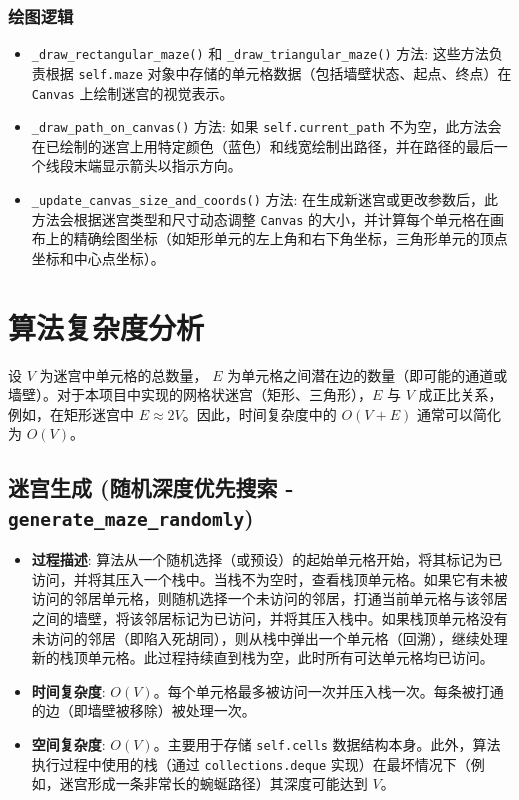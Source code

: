 \documentclass[UTF8]{report}
\theoremstyle{MyLineTheoremStyle} %
\theoremstyle{MyBlockTheoremStyle} %
\theoremstyle{MySubsubsectionStyle} %
\begin{document}
\subsubsection{绘图逻辑}
\begin{itemize}
    \item \texttt{\_draw\_rectangular\_maze()} 和 \texttt{\_draw\_triangular\_maze()} 方法: 这些方法负责根据 \texttt{self.maze} 对象中存储的单元格数据（包括墙壁状态、起点、终点）在 \texttt{Canvas} 上绘制迷宫的视觉表示。
    \item \texttt{\_draw\_path\_on\_canvas()} 方法: 如果 \texttt{self.current\_path} 不为空，此方法会在已绘制的迷宫上用特定颜色（蓝色）和线宽绘制出路径，并在路径的最后一个线段末端显示箭头以指示方向。
    \item \texttt{\_update\_canvas\_size\_and\_coords()} 方法: 在生成新迷宫或更改参数后，此方法会根据迷宫类型和尺寸动态调整 \texttt{Canvas} 的大小，并计算每个单元格在画布上的精确绘图坐标（如矩形单元的左上角和右下角坐标，三角形单元的顶点坐标和中心点坐标）。
\end{itemize}

\section{算法复杂度分析}

设 $V$ 为迷宫中单元格的总数量， $E$ 为单元格之间潜在边的数量（即可能的通道或墙壁）。对于本项目中实现的网格状迷宫（矩形、三角形），$E$ 与 $V$ 成正比关系，例如，在矩形迷宫中 $E \approx 2V$。因此，时间复杂度中的 $O(V+E)$ 通常可以简化为 $O(V)$。

\subsection{迷宫生成 (随机深度优先搜索 - \texttt{generate\_maze\_randomly})}
\begin{itemize}
    \item \textbf{过程描述}: 算法从一个随机选择（或预设）的起始单元格开始，将其标记为已访问，并将其压入一个栈中。当栈不为空时，查看栈顶单元格。如果它有未被访问的邻居单元格，则随机选择一个未访问的邻居，打通当前单元格与该邻居之间的墙壁，将该邻居标记为已访问，并将其压入栈中。如果栈顶单元格没有未访问的邻居（即陷入死胡同），则从栈中弹出一个单元格（回溯），继续处理新的栈顶单元格。此过程持续直到栈为空，此时所有可达单元格均已访问。
    \item \textbf{时间复杂度}: $O(V)$。每个单元格最多被访问一次并压入栈一次。每条被打通的边（即墙壁被移除）被处理一次。
    \item \textbf{空间复杂度}: $O(V)$。主要用于存储 \texttt{self.cells} 数据结构本身。此外，算法执行过程中使用的栈（通过 \texttt{collections.deque} 实现）在最坏情况下（例如，迷宫形成一条非常长的蜿蜒路径）其深度可能达到 $V$。
\end{itemize}
\end{document}
